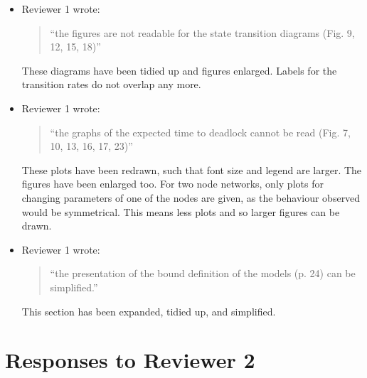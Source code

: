 \documentclass{article}
\begin{document}
\begin{itemize}
\item Reviewer 1 wrote:
\begin{quote}
``the figures are not readable for the state transition diagrams (Fig. 9, 12,
15, 18)''
\end{quote}
These diagrams have been tidied up and figures enlarged.
Labels for the transition rates do not overlap any more.

\item Reviewer 1 wrote:
\begin{quote}
``the graphs of the expected time to deadlock cannot be read (Fig. 7, 10, 13,
16, 17, 23)''
\end{quote}
These plots have been redrawn, such that font size and legend are larger.
The figures have been enlarged too.
For two node networks, only plots for changing parameters of one of the nodes
are given, as the behaviour observed would be symmetrical.
This means less plots and so larger figures can be drawn.


\item Reviewer 1 wrote:
\begin{quote}
``the presentation of the bound definition of the models (p. 24) can be
simplified.''
\end{quote}
This section has been expanded, tidied up, and simplified.

\end{itemize}



\section*{Responses to Reviewer 2}
\end{document}
